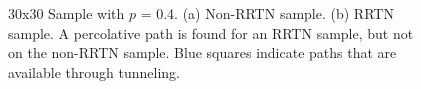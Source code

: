 \documentclass[11pt,a4paper]{report}
\begin{document}
\newpage
\begin{figure}[t!]
\begin{minipage}{.5\linewidth}
\centering
{}
\end{minipage}
\begin{minipage}{.5\linewidth}
\centering
{}

\end{minipage}\par\medskip
\caption{30x30 Sample with $p$ = 0.4. (a) Non-RRTN sample. (b) RRTN sample. A percolative path is found for an RRTN sample, but not on the non-RRTN sample. Blue squares indicate paths that are available through tunneling.}\label{fig:RRTN_simulation_result}
\end{figure}
\end{document}
